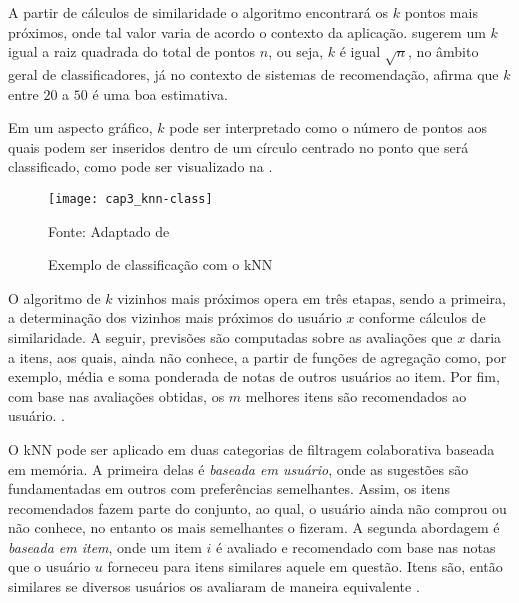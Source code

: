             A partir de cálculos de similaridade o algoritmo encontrará os $k$ pontos mais próximos, onde tal valor varia de acordo o contexto da aplicação.  sugerem um $k$  igual a raiz quadrada do total de pontos $n$, ou seja, $k$ é igual $\sqrt{n}$, no âmbito geral de classificadores, já no contexto de sistemas de recomendação,  afirma que $k$  entre $20$ a $50$ é uma boa estimativa. 
            
            Em um aspecto gráfico, $k$ pode ser interpretado como o número de pontos aos quais podem ser inseridos dentro de um círculo centrado no ponto que será classificado, como pode ser visualizado na . 
            
            \begin{figure}[htb]
                \caption{Exemplo de classificação com o kNN}
                \texttt{[image: cap3\_knn-class]}
                \label{fig:cap3_knn-class}
                
                {\footnotesize Fonte: Adaptado de }
            \end{figure}            
            
                 
            O algoritmo de $k$ vizinhos mais próximos opera em três etapas, sendo a primeira, a determinação dos vizinhos mais próximos do usuário $x$ conforme cálculos de similaridade. A seguir, previsões são computadas sobre as avaliações que $x$ daria a itens, aos quais, ainda não conhece, a partir de funções de agregação como, por exemplo, média e soma ponderada de notas de outros usuários ao item. Por fim, com base nas avaliações obtidas, os $m$ melhores itens são recomendados ao usuário. \cite{Bobadilla_2013}.
            
            O kNN pode ser aplicado em duas categorias de filtragem colaborativa baseada em memória. A primeira delas é \textit{baseada em usuário}, onde as sugestões são fundamentadas em outros com preferências semelhantes. Assim, os itens recomendados fazem parte do conjunto, ao qual, o usuário ainda não comprou ou não conhece, no entanto os mais semelhantes o fizeram.             
            A segunda abordagem é \textit{baseada em item}, onde um item $i$ é avaliado e recomendado com base nas notas que o usuário $u$ forneceu para itens similares aquele em questão. Itens são, então similares se diversos usuários os avaliaram de maneira equivalente \cite{Ricci2010}.
            
